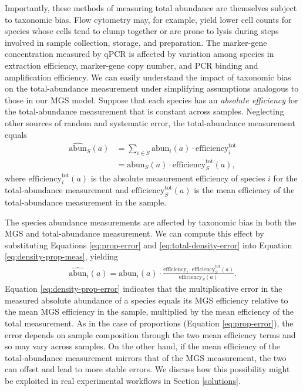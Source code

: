 \documentclass[
]{article}
\begin{document}
Importantly, these methods of measuring total abundance are themselves subject to taxonomic bias.
Flow cytometry may, for example, yield lower cell counts for species whose cells tend to clump together or are prone to lysis during steps involved in sample collection, storage, and preparation.
The marker-gene concentration measured by qPCR is affected by variation among species in extraction efficiency, marker-gene copy number, and PCR binding and amplification efficiency.
We can easily understand the impact of taxonomic bias on the total-abundance measurement under simplifying assumptions analogous to those in our MGS model.
Suppose that each species has an \emph{absolute efficiency} for the total-abundance measurement that is constant across samples.
Neglecting other sources of random and systematic error, the total-abundance measurement equals
\begin{align}
  \label{eq:total-density-error}
  \widehat{\text{abun}}_S(a) 
  &= \sum_{i\in S} \text{abun}_i(a) \cdot \text{efficiency}^{\text{tot}}_i
\\&= \text{abun}_S(a) \cdot \text{efficiency}^{\text{tot}}_S(a),
\end{align}
where \(\text{efficiency}_{i}^{\text{tot}}(a)\) is the absolute measurement efficiency of species \(i\) for the total-abundance measurement and \(\text{efficiency}^{\text{tot}}_S(a)\) is the mean efficiency of the total-abundance measurement in the sample.

The species abundance measurements are affected by taxonomic bias in both the MGS and total-abundance measurement.
We can compute this effect by substituting Equations \eqref{eq:prop-error} and \eqref{eq:total-density-error} into Equation \eqref{eq:density-prop-meas}, yielding
\begin{align}
  \label{eq:density-prop-error}
  \widehat{\text{abun}}_{i}(a) 
  = \text{abun}_{i}(a) \cdot \frac{\text{efficiency}_{i} \cdot \text{efficiency}^{\text{tot}}_S(a)}{\text{efficiency}_S(a)}.
\end{align}
Equation \eqref{eq:density-prop-error} indicates that the multiplicative error in the measured absolute abundance of a species equals its MGS efficiency relative to the mean MGS efficiency in the sample, multiplied by the mean efficiency of the total measurement.
As in the case of proportions (Equation \eqref{eq:prop-error}), the error depends on sample composition through the two mean efficiency terms and so may vary across samples.
On the other hand, if the mean efficiency of the total-abundance measurement mirrors that of the MGS measurement, the two can offset and lead to more stable errors.
We discuss how this possibility might be exploited in real experimental workflows in Section \ref{solutions}.
\end{document}
